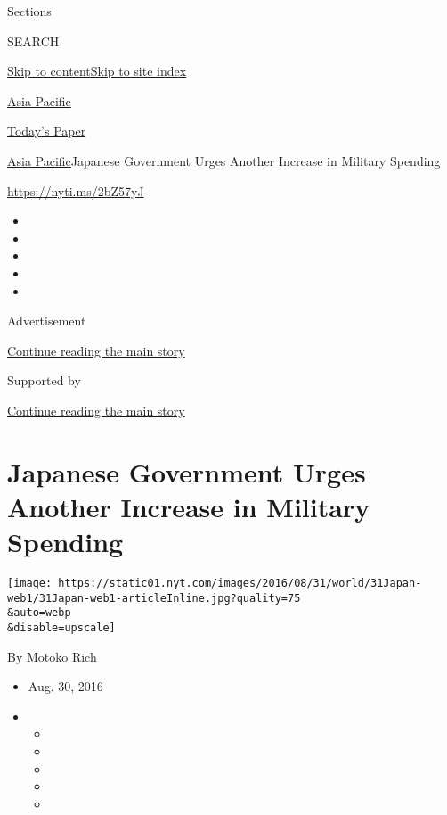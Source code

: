 Sections

SEARCH

\protect\hyperlink{site-content}{Skip to
content}\protect\hyperlink{site-index}{Skip to site index}

\href{https://www.nytimes.com/section/world/asia}{Asia Pacific}

\href{https://myaccount.nytimes.com/auth/login?response_type=cookie\&client_id=vi}{}

\href{https://www.nytimes.com/section/todayspaper}{Today's Paper}

\href{/section/world/asia}{Asia Pacific}\textbar{}Japanese Government
Urges Another Increase in Military Spending

\url{https://nyti.ms/2bZ57yJ}

\begin{itemize}
\item
\item
\item
\item
\item
\end{itemize}

Advertisement

\protect\hyperlink{after-top}{Continue reading the main story}

Supported by

\protect\hyperlink{after-sponsor}{Continue reading the main story}

\hypertarget{japanese-government-urges-another-increase-in-military-spending}{%
\section{Japanese Government Urges Another Increase in Military
Spending}\label{japanese-government-urges-another-increase-in-military-spending}}

\texttt{[image: https://static01.nyt.com/images/2016/08/31/world/31Japan-web1/31Japan-web1-articleInline.jpg?quality=75\\\&auto=webp\\\&disable=upscale]}

By \href{http://www.nytimes.com/by/motoko-rich}{Motoko Rich}

\begin{itemize}
\item
  Aug. 30, 2016
\item
  \begin{itemize}
  \item
  \item
  \item
  \item
  \item
  \end{itemize}
\end{itemize}

